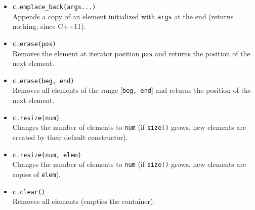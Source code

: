 \documentclass{report}
\begin{document}
\begin{itemize}
    \item \texttt{c.emplace\_back(args...)} \\
          Appends a copy of an element initialized with \texttt{args} at the end (returns nothing; since C++11).
          
    \item \texttt{c.erase(pos)} \\
          Removes the element at iterator position \texttt{pos} and returns the position of the next element.
          
    \item \texttt{c.erase(beg, end)} \\
          Removes all elements of the range [\texttt{beg, end}] and returns the position of the next element.
          
    \item \texttt{c.resize(num)} \\
          Changes the number of elements to \texttt{num} (if \texttt{size()} grows, new elements are created by their default constructor).
          
    \item \texttt{c.resize(num, elem)} \\
          Changes the number of elements to \texttt{num} (if \texttt{size()} grows, new elements are copies of \texttt{elem}).
          
    \item \texttt{c.clear()} \\
          Removes all elements (empties the container).
\end{itemize}

\bigbreak \noindent 
\end{document}

